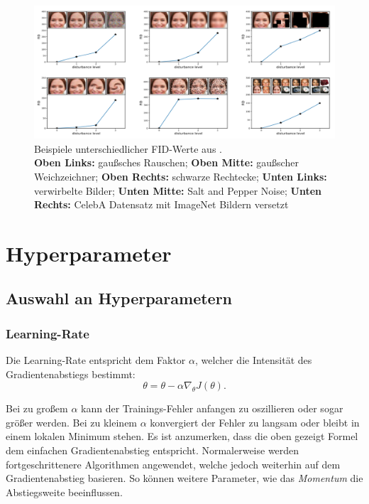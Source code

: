 \begin{figure}[H]
	\centering
	\includegraphics[width=16cm]{kapitel/2_stand_der_technik/img/fid-example.png}
	\caption[Beispiel von unterschiedlichen FID-Werten]{Beispiele unterschiedlicher FID-Werte aus \cite{fid}.\\ \textbf{Oben Links:} gaußsches Rauschen; \textbf{Oben Mitte:} gaußscher Weichzeichner; \textbf{Oben Rechts:} schwarze Rechtecke; \textbf{Unten Links:} verwirbelte Bilder; \textbf{Unten Mitte:} Salt and Pepper Noise; \textbf{Unten Rechts:} CelebA Datensatz mit ImageNet Bildern versetzt }
	\label{fid-example}
\end{figure}

\section{Hyperparameter}
\subsection{Auswahl an Hyperparametern}

\subsubsection{Learning-Rate}
Die Learning-Rate entspricht dem Faktor \(\alpha\), welcher die Intensität des Gradientenabstiegs bestimmt:  
\begin{equation}
	\theta  =  \theta  - \alpha   \nabla_{ \theta }  J( \theta ).
\end{equation}

Bei zu großem \(\alpha\) kann der Trainings-Fehler anfangen zu oszillieren oder sogar größer werden.
Bei zu kleinem \(\alpha\) konvergiert der Fehler zu langsam oder bleibt in einem lokalen Minimum stehen. 
Es ist anzumerken, dass die oben gezeigt Formel dem einfachen Gradientenabstieg entspricht.
Normalerweise werden fortgeschrittenere Algorithmen angewendet, welche jedoch weiterhin auf dem Gradientenabstieg basieren.
So können weitere Parameter, wie das \textit{Momentum} die Abstiegsweite beeinflussen.
\newline

